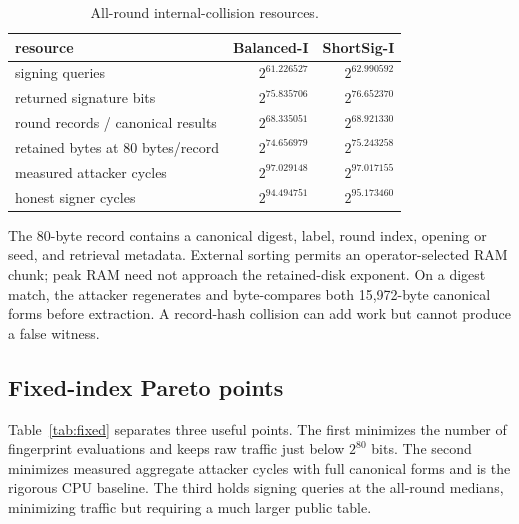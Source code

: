 \documentclass[11pt,a4paper]{article}
\begin{document}
\begin{table}[ht]
\centering
\caption{All-round internal-collision resources.}
\label{tab:allround}
\begin{tabular}{lrr}
\toprule
resource & Balanced-I & ShortSig-I\\
\midrule
signing queries & $2^{61.226527}$ & $2^{62.990592}$\\
returned signature bits & $2^{75.835706}$ & $2^{76.652370}$\\
round records / canonical results & $2^{68.335051}$ & $2^{68.921330}$\\
retained bytes at 80 bytes/record & $2^{74.656979}$ & $2^{75.243258}$\\
measured attacker cycles & $2^{97.029148}$ & $2^{97.017155}$\\
honest signer cycles & $2^{94.494751}$ & $2^{95.173460}$\\
\bottomrule
\end{tabular}
\end{table}

The $80$-byte record contains a canonical digest, label, round index, opening or
seed, and retrieval metadata.  External sorting permits an operator-selected
RAM chunk; peak RAM need not approach the retained-disk exponent.  On a digest
match, the attacker regenerates and byte-compares both 15,972-byte canonical
forms before extraction.  A record-hash collision can add work but cannot
produce a false witness.

\subsection{Fixed-index Pareto points}

Table~\ref{tab:fixed} separates three useful points.  The first minimizes the
number of fingerprint evaluations and keeps raw traffic just below $2^{80}$
bits.  The second minimizes measured aggregate attacker cycles with full
canonical forms and is the rigorous CPU baseline.  The third holds signing
queries at the all-round medians, minimizing traffic but requiring a much
larger public table.
\end{document}
